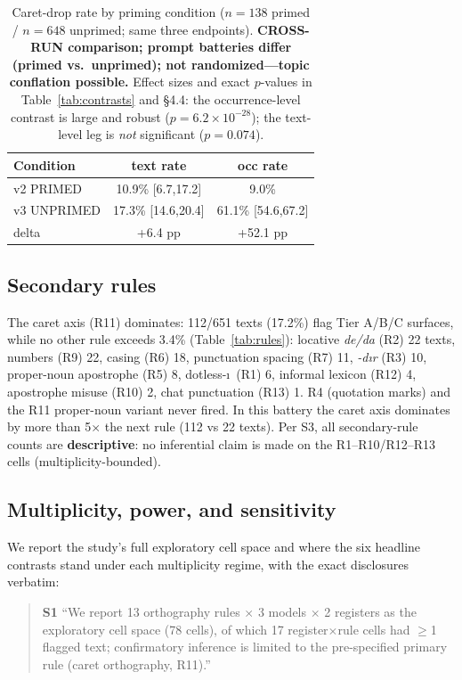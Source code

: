 \documentclass[11pt]{article}
\begin{document}
\begin{table}[t]
\centering
\scriptsize
\begin{tabular}{lcc}
\toprule
Condition & text rate & occ rate \\
\midrule
v2 PRIMED & 10.9\% [6.7,17.2] & 9.0\% \\
v3 UNPRIMED & 17.3\% [14.6,20.4] & 61.1\% [54.6,67.2] \\
\midrule
delta & +6.4 pp & +52.1 pp \\
\bottomrule
\end{tabular}
\caption{Caret-drop rate by priming condition ($n{=}138$ primed / $n{=}648$ unprimed; same three endpoints). \textbf{CROSS-RUN comparison; prompt batteries differ (primed vs.\ unprimed); not randomized---topic conflation possible.} Effect sizes and exact $p$-values in Table~\ref{tab:contrasts} and \S4.4: the occurrence-level contrast is large and robust ($p{=}6.2\times10^{-28}$); the text-level leg is \emph{not} significant ($p{=}0.074$).}
\label{tab:priming}
\end{table}

\subsection{Secondary rules}

The caret axis (R11) dominates: 112/651 texts (17.2\%) flag Tier A/B/C surfaces, while no other rule exceeds 3.4\% (Table~\ref{tab:rules}): locative \emph{de/da} (R2) 22 texts, numbers (R9) 22, casing (R6) 18, punctuation spacing (R7) 11, \emph{-d{\i}r} (R3) 10, proper-noun apostrophe (R5) 8, dotless-\i\ (R1) 6, informal lexicon (R12) 4, apostrophe misuse (R10) 2, chat punctuation (R13) 1. R4 (quotation marks) and the R11 proper-noun variant never fired. In this battery the caret axis dominates by more than 5$\times$ the next rule (112 vs 22 texts). Per S3, all secondary-rule counts are \textbf{descriptive}: no inferential claim is made on the R1--R10/R12--R13 cells (multiplicity-bounded).

\subsection{Multiplicity, power, and sensitivity}

We report the study's full exploratory cell space and where the six headline contrasts stand under each multiplicity regime, with the exact disclosures verbatim:

\begin{quote}\small
\textbf{S1} ``We report 13 orthography rules ${\times}$ 3 models ${\times}$ 2 registers as the exploratory cell space (78 cells), of which 17 register${\times}$rule cells had ${\geq}$1 flagged text; confirmatory inference is limited to the pre-specified primary rule (caret orthography, R11).''
\end{quote}
\end{document}

